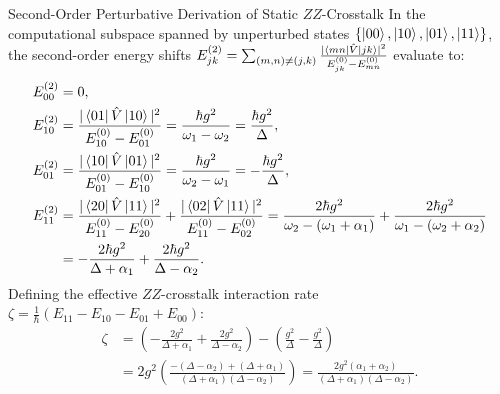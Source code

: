 \begin{theorembox}{Second-Order Perturbative Derivation of Static $ZZ$-Crosstalk}
In the computational subspace spanned by unperturbed states $\{\ket{00}, \ket{10}, \ket{01}, \ket{11}\}$, the second-order energy shifts $E_{jk}^{(2)} = \sum_{(m,n) \neq (j,k)} \frac{|\bra{mn}\hat{V}\ket{jk}|^2}{E_{jk}^{(0)} - E_{mn}^{(0)}}$ evaluate to:
\begin{align}
    E_{00}^{(2)} &= 0, \\
    E_{10}^{(2)} &= \frac{|\bra{01}\hat{V}\ket{10}|^2}{E_{10}^{(0)} - E_{01}^{(0)}} = \frac{\hbar g^2}{\omega_1 - \omega_2} = \frac{\hbar g^2}{\Delta}, \\
    E_{01}^{(2)} &= \frac{|\bra{10}\hat{V}\ket{01}|^2}{E_{01}^{(0)} - E_{10}^{(0)}} = \frac{\hbar g^2}{\omega_2 - \omega_1} = -\frac{\hbar g^2}{\Delta}, \\
    E_{11}^{(2)} &= \frac{|\bra{20}\hat{V}\ket{11}|^2}{E_{11}^{(0)} - E_{20}^{(0)}} + \frac{|\bra{02}\hat{V}\ket{11}|^2}{E_{11}^{(0)} - E_{02}^{(0)}} = \frac{2\hbar g^2}{\omega_2 - (\omega_1 + \alpha_1)} + \frac{2\hbar g^2}{\omega_1 - (\omega_2 + \alpha_2)} \nonumber \\
    &= -\frac{2\hbar g^2}{\Delta + \alpha_1} + \frac{2\hbar g^2}{\Delta - \alpha_2}.
\end{align}
Defining the effective $ZZ$-crosstalk interaction rate $\zeta = \frac{1}{\hbar}(E_{11} - E_{10} - E_{01} + E_{00})$:
\begin{align}
    \zeta &= \left( -\frac{2g^2}{\Delta + \alpha_1} + \frac{2g^2}{\Delta - \alpha_2} \right) - \left( \frac{g^2}{\Delta} - \frac{g^2}{\Delta} \right) \nonumber \\
    &= 2g^2 \left( \frac{-(\Delta - \alpha_2) + (\Delta + \alpha_1)}{(\Delta + \alpha_1)(\Delta - \alpha_2)} \right) = \frac{2 g^2 (\alpha_1 + \alpha_2)}{(\Delta + \alpha_1)(\Delta - \alpha_2)}.
    \label{eq:zz_crosstalk_exact_proof}
\end{align}
\end{theorembox}

